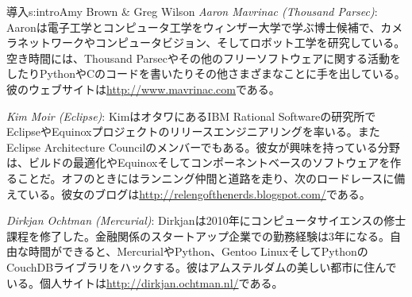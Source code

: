 \begin{aosachapter}{導入}{s:intro}{Amy Brown \& Greg Wilson}
\emph{Aaron Mavrinac (Thousand Parsec)}: Aaronは電子工学とコンピュータ工学をウィンザー大学で学ぶ博士候補で、カメラネットワークやコンピュータビジョン、そしてロボット工学を研究している。空き時間には、Thousand Parsecやその他のフリーソフトウェアに関する活動をしたりPythonやCのコードを書いたりその他さまざまなことに手を出している。彼のウェブサイトは\url{http://www.mavrinac.com}である。

\emph{Kim Moir (Eclipse)}: KimはオタワにあるIBM Rational Softwareの研究所でEclipseやEquinoxプロジェクトのリリースエンジニアリングを率いる。またEclipse Architecture Councilのメンバーでもある。彼女が興味を持っている分野は、ビルドの最適化やEquinoxそしてコンポーネントベースのソフトウェアを作ることだ。オフのときにはランニング仲間と道路を走り、次のロードレースに備えている。彼女のブログは\url{http://relengofthenerds.blogspot.com/}である。

\emph{Dirkjan Ochtman (Mercurial)}: Dirkjanは2010年にコンピュータサイエンスの修士課程を修了した。金融関係のスタートアップ企業での勤務経験は3年になる。自由な時間ができると、MercurialやPython、Gentoo LinuxそしてPythonのCouchDBライブラリをハックする。彼はアムステルダムの美しい都市に住んでいる。個人サイトは\url{http://dirkjan.ochtman.nl/}である。


\end{aosachapter}
